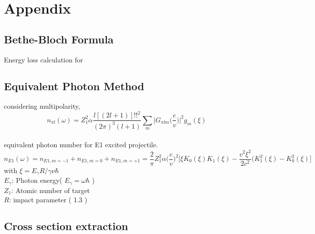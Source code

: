 \renewcommand{\thechapter}{A}
\def\theequation{A.\arabic{section}.\arabic{equation}}
\makeatletter
{}
\makeatother
\chapter*{Appendix}


\section{Bethe-Bloch Formula}
Energy loss calculation for 

\section{Equivalent Photon Method}
considering multipolarity, 
\begin{displaymath}
    n_{\pi l}(\omega)=Z^{2}_{1} \alpha \frac{l[(2l+1)]!!^{2}}{(2\pi)^{3}(l+1)}\sum_{m}\Big|G_{\pi l m}\big( \frac{c}{v}\big) \Big|^{2} g_{m}(\xi)
\end{displaymath} \\
equivalent photon number for E1 excited projectile.
\begin{displaymath}
    n_{E1}(\omega)=n_{E1, m=-1}+n_{E1, m=0}+n_{E1, m=+1}=\frac{2}{\pi}Z^{2}_{1}\alpha\Big(\frac{c}{v}\Big)^{2}\Big[\xi K_{0}(\xi)K_{1}(\xi)-\frac{v^{2}\xi^{2}}{2c^{2}}(K^{2}_{1}(\xi)-K^{2}_{0}(\xi)\Big]
\end{displaymath}
with $\xi=E_{\gamma}R/\gamma \nu \hbar$\\
$E_{\gamma}$: Photon energy( $E_{\gamma}=\omega\hbar$ )\\
$Z_{1}$: Atomic number of target\\
$R$: impact parameter ( 1.3 )\\


\section{Cross section extraction}


